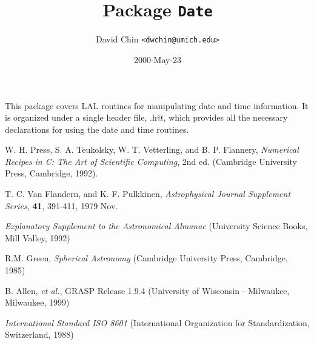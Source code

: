 \documentclass{article}
\begin{document}
\title{Package \texttt{Date}}
\author{David Chin \texttt{<dwchin@umich.edu>}}
\date{2000-May-23}
\maketitle

This package covers LAL routines for manipulating date and time
information.  It is organized under a single header file, \verb@Date.h@,
which provides all the necessary declarations for using the date and time
routines. 















\begin{thebibliography}{0}
  W. H. Press, S. A. Teukolsky, W. T. Vetterling, and B. P. Flannery,
  \textit{Numerical Recipes in C: The Art of Scientific Computing}, 2nd ed.
  (Cambridge University Press, Cambridge, 1992).

  T. C. Van Flandern, and K. F. Pulkkinen, 
  \textit{Astrophysical Journal  Supplement Series}, \textbf{41},
  391-411, 1979 Nov.
  
  \textit{Explanatory Supplement to the Astronomical Almanac} (University
  Science Books, Mill Valley, 1992)
  
  R.M. Green, \textit{Spherical Astronomy} (Cambridge University Press,
  Cambridge, 1985)
  
  B. Allen, \textit{et al.}, GRASP Release 1.9.4 (University of Wisconsin
  - Milwaukee, Milwaukee, 1999)
  
  \textit{International Standard ISO 8601} (International Organization for
  Standardization, Switzerland, 1988)
  
\end{thebibliography}
\end{document}
